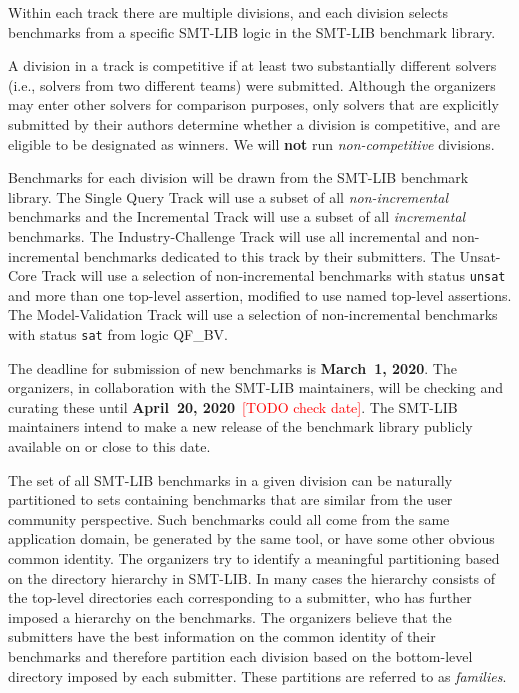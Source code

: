 \documentclass[12pt]{article}
\newcommand{\rem}[1]{\textcolor{red}{[#1]}}
\newcommand{\todo}[1]{\rem{TODO #1}}
\newcommand{\maintrack}{Single Query Track\xspace}
\newcommand{\inctrack}{Incremental Track\xspace}
\newcommand{\ucoretrack}{Unsat-Core Track\xspace}
\newcommand{\mvaltrack}{Model-Validation Track\xspace}
\newcommand{\challtrack}{Industry-Challenge Track\xspace}
\begin{document}
Within each track there are multiple divisions, and each division selects
benchmarks from a specific SMT-LIB logic in the SMT-LIB benchmark library.

A division in a track is competitive if at least two substantially
different solvers (i.e., solvers from two different teams) were
submitted.  Although the organizers may enter other solvers for
comparison purposes, only solvers that are explicitly submitted by
their authors determine whether a division is competitive, and are
eligible to be designated as winners.
We will \textbf{not} run \emph{non-competitive} divisions.

Benchmarks for each division will be drawn from the SMT-LIB benchmark library.
The \maintrack will use a subset of all \emph{non-incremental} benchmarks and
the \inctrack will use a subset of all \emph{incremental} benchmarks. The
\challtrack will use all incremental and non-incremental benchmarks dedicated
to this track by their submitters. The \ucoretrack will use a selection of
non-incremental benchmarks with status \texttt{unsat} and more than one
top-level assertion, modified to use named top-level assertions.  The
\mvaltrack will use a selection of non-incremental benchmarks with status
\texttt{sat} from logic QF\_BV.

The deadline for submission of new benchmarks is {\bf March~1, 2020}.
The organizers, in collaboration with the SMT-LIB maintainers, will be
checking and curating these until {\bf April~20, 2020}~\todo{check date}.  The SMT-LIB
maintainers intend to make a new release of the benchmark library
publicly available on or close to this date.

The set of all SMT-LIB benchmarks in a given division can be naturally
partitioned to sets containing benchmarks that are similar from the user
community perspective.  Such benchmarks could all come from the same
application domain, be generated by the same tool, or have some other
obvious common identity.
%
The organizers try to identify a meaningful partitioning based on the
directory hierarchy in SMT-LIB.  In many cases the hierarchy consists of
the top-level directories each corresponding to a submitter, who has
further imposed a hierarchy on the benchmarks.
%
The organizers believe that the submitters have the best information on
the common identity of their benchmarks and therefore partition each
division based on the bottom-level directory imposed by each submitter.
These partitions are referred to as \emph{families}.
\end{document}
